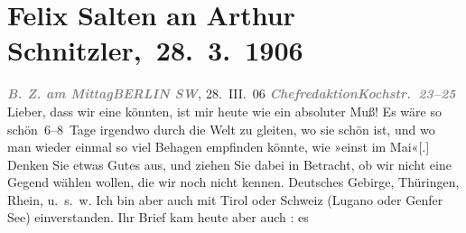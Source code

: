                \section[ Felix Salten an Arthur Schnitzler, 28. 3. 1906]{ Felix Salten an Arthur Schnitzler, 28. 3. 1906}\nopagebreak{}\rehead{ }\begin{ledgroupsized}[t]{13cm}\normalsize\beginnumbering \toendnotes[C]{\smallbreak\pagebreak[2]} 
\toendnotes[C]{\smallbreak}\pstart
           \noindent{}{\pb}\textcolor{gray}{\textbf{\emph{B. Z. am Mittag}}}\hfill \textcolor{gray}{\textbf{\emph{BERLIN SW},}}{ }28. III. 06\pend
           \pstart
           \textcolor{gray}{\textbf{\emph{Chefredaktion}}}\hfill \textcolor{gray}{\textbf{\emph{Kochstr. 23–25}}}\pend
           \pstart
           Lieber, dass wir eine \label{K_L03416-1v}\label{K_L03416-1h} könnten,
               ist mir heute wie ein absoluter Muß! Es wäre so schön 6–8 Tage irgendwo durch die
               Welt zu gleiten, wo sie schön ist, und wo man wieder einmal so viel Behagen empfinden
               könnte, wie »einst im Mai«{[}.{]} Denken Sie etwas Gutes aus, und
               ziehen Sie dabei in Betracht, ob wir nicht eine Gegend wählen wollen, die wir noch
               nicht kennen. Deutsches Gebirge, Thüringen, Rhein, u. s. w. Ich bin aber auch mit Tirol oder Schweiz (Lugano oder Genfer See) einverstanden. Ihr Brief kam heute aber auch \label{K_L03416-2v}\label{K_L03416-2h}: es

\end{ledgroupsized}
